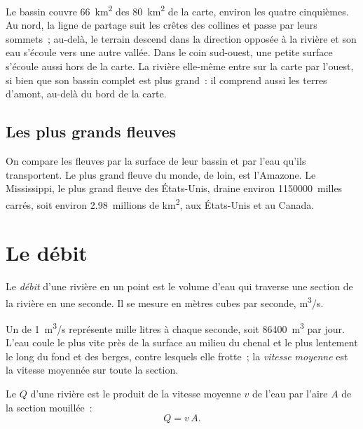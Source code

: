 Le bassin couvre \qty{66}{km^2} des \qty{80}{km^2} de la carte, environ les
quatre cinquièmes. Au nord, la ligne de partage suit les crêtes des collines
et passe par leurs sommets~; au-delà, le terrain descend dans la direction
opposée à la rivière et son eau s'écoule vers une autre vallée. Dans le
coin sud-ouest, une petite surface s'écoule aussi hors de la carte. La
rivière elle-même entre sur la carte par l'ouest, si bien que son bassin
complet est plus grand~: il comprend aussi les terres d'amont, au-delà du
bord de la carte.

\subsection*{Les plus grands fleuves}

On compare les fleuves par la surface de leur bassin et par l'eau qu'ils
transportent. Le plus grand fleuve du monde, de loin, est l'Amazone. Le
Mississippi, le plus grand fleuve des États-Unis, draine environ
\num{1150000}~milles carrés, soit environ 2.98~millions de \unit{km^2}, aux
États-Unis et au Canada.

\section{Le débit}

\begin{definition}[Débit]\label{def:g10:drainage-basins:discharge}
Le \emph{débit} d'une rivière en un point est le volume
d'eau qui traverse une section de la rivière en une seconde. Il se mesure en
mètres cubes par seconde, \unit{m^3/s}.
\end{definition}

Un  de \qty{1}{m^3/s} représente mille litres à chaque seconde, soit
\qty{86400}{m^3} par jour. L'eau coule le plus vite près de la surface au
milieu du chenal et le plus lentement le long du fond et des berges, contre
lesquels elle frotte~; la \emph{vitesse moyenne} est la vitesse moyennée sur
toute la section.

\begin{proposition}\label{prop:g10:drainage-basins:discharge}
Le  $Q$ d'une rivière est le produit de la vitesse moyenne $v$ de l'eau
par l'aire $A$ de la section mouillée~:
\[
Q = v\,A.
\]
\end{proposition}

